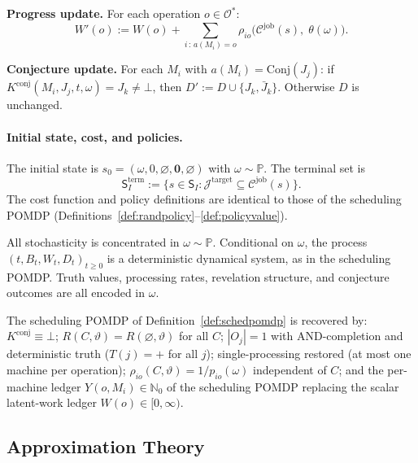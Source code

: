 \medskip
\noindent\textbf{Progress update.} For each operation $o \in \mathcal{O}^*$:
\[
W'(o) := W(o) + \sum_{i\,:\, a(M_i) = o}
\rho_{io}\bigl(\mathcal{C}^{\mathrm{job}}(s),\; \theta(\omega)\bigr).
\]

\medskip
\noindent\textbf{Conjecture update.} For each $M_i$ with
$a(M_i) = \mathrm{Conj}(J_j)$: if
$K^{\mathrm{conj}}(M_i, J_j, t, \omega) = J_k \neq \bot$, then
$D' := D \cup \{J_k, \bar J_k\}$. Otherwise $D$ is unchanged.

\paragraph{Initial state, cost, and policies.}

The initial state is
$s_0 = (\omega, 0, \varnothing, \mathbf{0}, \varnothing)$ with
$\omega \sim \mathbb{P}$. The terminal set is
\[
\mathsf{S}_I^{\mathrm{term}} := \{s \in \mathsf{S}_I :
\mathcal{J}^{\mathrm{target}} \subseteq \mathcal{C}^{\mathrm{job}}(s)\}.
\]
The cost function and policy definitions are identical to those of
the scheduling POMDP (Definitions~\ref{def:randpolicy}--\ref{def:policyvalue}).

\begin{remark}
All stochasticity is concentrated in $\omega \sim \mathbb{P}$. Conditional on
$\omega$, the process $(t, B_t, W_t, D_t)_{t \ge 0}$ is a deterministic dynamical
system, as in the scheduling POMDP. Truth values, processing rates, revelation
structure, and conjecture outcomes are all encoded in $\omega$.
\end{remark}

\begin{remark}
The scheduling POMDP of Definition~\ref{def:schedpomdp} is recovered by:
$K^{\mathrm{conj}} \equiv \bot$;
$R(C, \vartheta) = R(\varnothing, \vartheta)$ for all $C$;
$|O_j| = 1$ with AND-completion and deterministic truth ($T(j) = +$ for all $j$);
single-processing restored (at most one machine per operation);
$\rho_{io}(C, \vartheta) = 1/p_{io}(\omega)$ independent of $C$;
and the per-machine ledger $Y(o, M_i) \in \mathbb{N}_0$ of the scheduling POMDP
replacing the scalar latent-work ledger $W(o) \in [0, \infty)$.
\end{remark}

\subsection{Approximation Theory}

